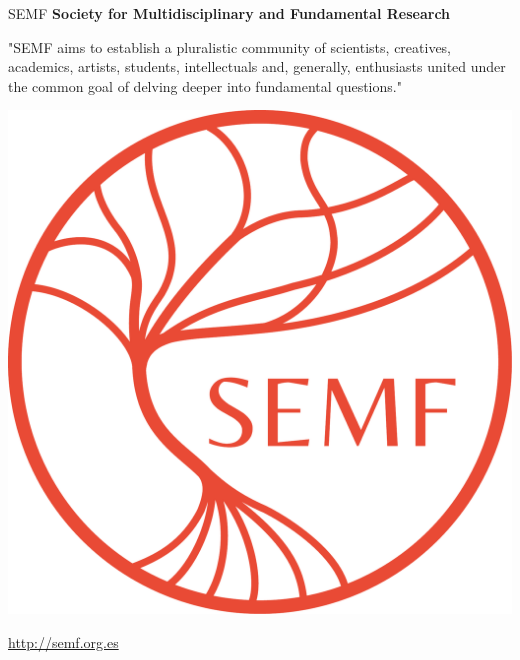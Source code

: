 \documentclass{beamer}
\begin{document}
\begin{frame}{SEMF}
    \centering
    \vspace*{3em}
    \alert{\textbf{Society for Multidisciplinary and Fundamental Research}}

    "SEMF aims to establish a pluralistic community of scientists, creatives, academics, artists, students, intellectuals and, generally, enthusiasts united under the common goal of delving deeper into fundamental questions."

    \vspace*{1em}
    \includegraphics[scale=0.1]{assets/semf_logo}
    
    \vspace*{1em}
    \url{http://semf.org.es}

\end{frame}
\end{document}
